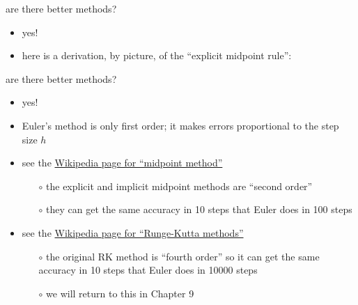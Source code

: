 \documentclass[colorlinks]{beamer}
\begin{document}
\begin{frame}{are there better methods?}

\begin{itemize}
\item yes!
\item here is a derivation, by picture, of the ``explicit midpoint rule'':
\end{itemize}

\vspace{60mm}
\end{frame}


\begin{frame}{are there better methods?}

\begin{itemize}
\item yes!
\item Euler's method is only first order; it makes errors proportional to the step size $h$
\item see the \href{https://en.wikipedia.org/wiki/Midpoint_method}{Wikipedia page for ``midpoint method''}
    \begin{itemize}
    \item[$\circ$] the explicit and implicit midpoint methods are ``second order''
    \item[$\circ$] they can get the same accuracy in 10 steps that Euler does in 100 steps
    \end{itemize}
\item see the \href{https://en.wikipedia.org/wiki/Runge-Kutta_methods}{Wikipedia page for ``Runge-Kutta methods''}
    \begin{itemize}
    \item[$\circ$] the original RK method is ``fourth order'' so it can get the same accuracy in 10 steps that Euler does in 10000 steps
    \item[$\circ$] we will return to this in Chapter 9
    \end{itemize}
\end{itemize}
\end{frame}
\end{document}
